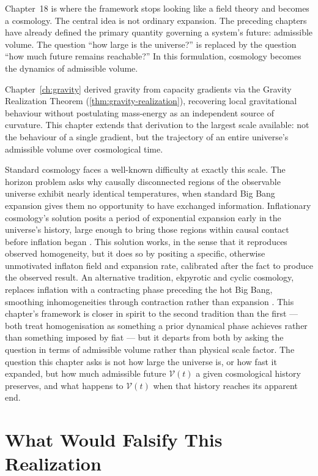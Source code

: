 \documentclass[12pt,twoside,openright]{book}
\begin{document}
Chapter~18 is where the framework stops looking like a
field theory and becomes a cosmology. The central idea is
not ordinary expansion. The preceding chapters have already
defined the primary quantity governing a system's future:
admissible volume. The question ``how large is the
universe?'' is replaced by the question ``how much future
remains reachable?'' In this formulation, cosmology becomes
the dynamics of admissible volume.

Chapter~\ref{ch:gravity} derived gravity from capacity
gradients via the Gravity Realization Theorem
(\cref{thm:gravity-realization}), recovering local
gravitational behaviour without postulating mass-energy as an
independent source of curvature. This chapter extends that
derivation to the largest scale available: not the behaviour
of a single gradient, but the trajectory of an entire
universe's admissible volume over cosmological time.

Standard cosmology faces a well-known difficulty at exactly
this scale. The horizon problem asks why causally
disconnected regions of the observable universe exhibit
nearly identical temperatures, when standard Big Bang
expansion gives them no opportunity to have exchanged
information. Inflationary cosmology's solution posits a
period of exponential expansion early in the universe's
history, large enough to bring those regions within causal
contact before inflation began \parencite{guth1981}. This
solution works, in the sense that it reproduces observed
homogeneity, but it does so by positing a specific, otherwise
unmotivated inflaton field and expansion rate, calibrated
after the fact to produce the observed result. An alternative
tradition, ekpyrotic and cyclic cosmology, replaces inflation
with a contracting phase preceding the hot Big Bang, smoothing
inhomogeneities through contraction rather than expansion
\parencite{steinhardt2002}. This chapter's framework is closer
in spirit to the second tradition than the first --- both
treat homogenisation as something a prior dynamical phase
achieves rather than something imposed by fiat --- but it
departs from both by asking the question in terms of
admissible volume rather than physical scale factor. The
question this chapter asks is not how large the universe is,
or how fast it expanded, but how much admissible future
$\mathcal{V}(t)$ a given cosmological history preserves, and
what happens to $\mathcal{V}(t)$ when that history reaches its
apparent end.

\section{What Would Falsify This Realization}
\label{sec:ch18-falsifiability}
\end{document}
